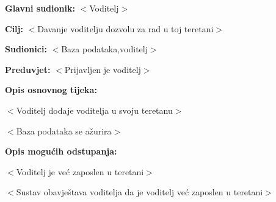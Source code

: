 					\noindent {}
					\begin{packed_item}
	
						\item \textbf{Glavni sudionik: } $<$Voditelj$>$
						\item  \textbf{Cilj:} $<$Davanje voditelju dozvolu za rad u toj teretani$>$
						\item  \textbf{Sudionici:} $<$Baza podataka,voditelj$>$
						\item  \textbf{Preduvjet:} $<$Prijavljen je voditelj$>$
						\item  \textbf{Opis osnovnog tijeka:}
						
						\item[] \begin{packed_enum}
	
							\item $<$Voditelj dodaje voditelja u svoju teretanu$>$
							\item $<$Baza podataka se ažurira$>$
						\end{packed_enum}
						
						\item  \textbf{Opis mogućih odstupanja:}
						
						\item[] \begin{packed_item}
	
							\item[1.] $<$Voditelj je već zaposlen u teretani$>$
							\item[] \begin{packed_enum}
								
								\item[a)] $<$Sustav obavještava voditelja da je voditelj već zaposlen u teretani$>$
						
								
							\end{packed_enum}
	
							
						\end{packed_item}
					\end{packed_item}
					
